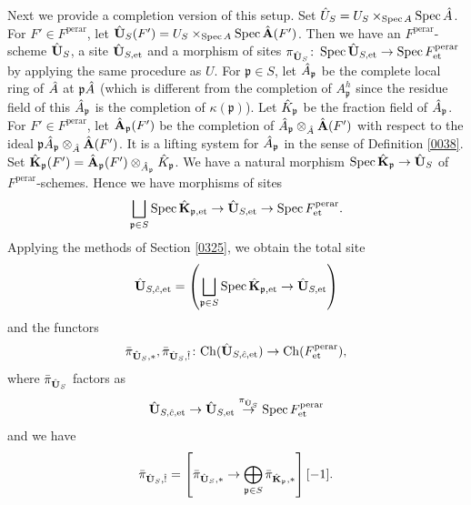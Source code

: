 \documentclass{amsart}
\theoremstyle{remark}
\numberwithin{equation}{subsection}
\newcommand{\tensor}{\mathbin{\otimes}}
\newcommand{\et}{\mathrm{et}}
\newcommand{\perar}{\mathrm{perar}}
\newcommand{\alg}[1]{\mathbf{#1}}
\newcommand{\Ch}{\mathrm{Ch}}
\newcommand{\ideal}[1]{\mathfrak{#1}}
\DeclareMathOperator{\Spec}{Spec}
\begin{document}
Next we provide a completion version of this setup.
Set $\Hat{U}_{S} = U_{S} \times_{\Spec A} \Spec \Hat{A}$.
For $F' \in F^{\perar}$,
let $\Hat{\alg{U}}_{S}(F') = U_{S} \times_{\Spec A} \Spec \Hat{\alg{A}}(F')$.
Then we have an $F^{\perar}$-scheme $\Hat{\alg{U}}_{S}$,
a site $\Hat{\alg{U}}_{S, \et}$ and a morphism of sites
$\pi_{\Hat{\alg{U}}_{S}} \colon \Spec \Hat{\alg{U}}_{S, \et} \to \Spec F^{\perar}_{\et}$
by applying the same procedure as $U$.
For $\ideal{p} \in S$,
let $\Hat{A}_{\ideal{p}}$ be the complete local ring of $\Hat{A}$ at $\ideal{p} \Hat{A}$
(which is different from the completion of $A_{\ideal{p}}^{h}$
since the residue field of this $\Hat{A}_{\ideal{p}}$ is the completion of $\kappa(\ideal{p})$).
Let $\Hat{K}_{\ideal{p}}$ be the fraction field of $\Hat{A}_{\ideal{p}}$.
For $F' \in F^{\perar}$,
let $\Hat{\alg{A}}_{\ideal{p}}(F')$ be the completion of
$\Hat{A}_{\ideal{p}} \tensor_{\Hat{A}} \Hat{\alg{A}}(F')$ with respect to the ideal
$\ideal{p} \Hat{A}_{\ideal{p}} \tensor_{\Hat{A}} \Hat{\alg{A}}(F')$.
It is a lifting system for $\Hat{A}_{\ideal{p}}$
in the sense of Definition \ref{0038}.
Set
	$
			\Hat{\alg{K}}_{\ideal{p}}(F')
		=
				\Hat{\alg{A}}_{\ideal{p}}(F')
			\tensor_{\Hat{A}_{\ideal{p}}}
				\Hat{K}_{\ideal{p}}
	$.
We have a natural morphism $\Spec \Hat{\alg{K}}_{\ideal{p}} \to \Hat{\alg{U}}_{S}$
of $F^{\perar}$-schemes.
Hence we have morphisms of sites
	\[
			\bigsqcup_{\ideal{p} \in S}
				\Spec \Hat{\alg{K}}_{\ideal{p}, \et}
		\to
			\Hat{\alg{U}}_{S, \et}
		\to
			\Spec F^{\perar}_{\et}.
	\]
Applying the methods of Section \ref{0325}, we obtain the total site
	\[
			\Hat{\alg{U}}_{S, \Hat{c}, \et}
		=
			\left(
					\bigsqcup_{\ideal{p} \in S}
						\Spec \Hat{\alg{K}}_{\ideal{p}, \et}
				\to
					\Hat{\alg{U}}_{S, \et}
			\right)
	\]
and the functors
	\[
			\Bar{\pi}_{\Hat{\alg{U}}_{S}, \ast},
			\Bar{\pi}_{\Hat{\alg{U}}_{S}, \Hat{!}}
		\colon
			\Ch(\Hat{\alg{U}}_{S, \Hat{c}, \et})
		\to
			\Ch(F^{\perar}_{\et}),
	\]
where $\Bar{\pi}_{\Hat{\alg{U}}_{S}}$ factors as
	\[
			\Hat{\alg{U}}_{S, \Hat{c}, \et}
		\to
			\Hat{\alg{U}}_{S, \et}
		\stackrel{\pi_{\Hat{\alg{U}}_{S}}}{\to}
			\Spec F^{\perar}_{\et}
	\]
and we have
	\[
			\Bar{\pi}_{\Hat{\alg{U}}_{S}, \Hat{!}}
		=
			\left[
					\Bar{\pi}_{\Hat{\alg{U}}_{S}, \ast}
				\to
					\bigoplus_{\ideal{p} \in S}
						\Bar{\pi}_{\Hat{\alg{K}}_{\ideal{p}}, \ast}
			\right][-1].
	\]
\end{document}
